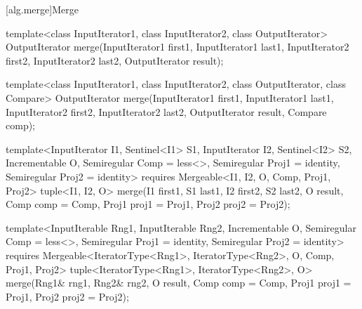 [alg.merge]{Merge}

%
\begin{removedblock}
\begin{itemdecl}
template<class InputIterator1, class InputIterator2,
         class OutputIterator>
  OutputIterator
    merge(InputIterator1 first1, InputIterator1 last1,
          InputIterator2 first2, InputIterator2 last2,
          OutputIterator result);

template<class InputIterator1, class InputIterator2,
         class OutputIterator, class Compare>
  OutputIterator
    merge(InputIterator1 first1, InputIterator1 last1,
          InputIterator2 first2, InputIterator2 last2,
          OutputIterator result, Compare comp);
\end{itemdecl}
\end{removedblock}
\begin{addedblock}
\begin{itemdecl}
template<InputIterator I1, Sentinel<I1> S1, InputIterator I2, Sentinel<I2> S2,
    Incrementable O, Semiregular Comp = less<>, Semiregular Proj1 = identity,
    Semiregular Proj2 = identity>
  requires Mergeable<I1, I2, O, Comp, Proj1, Proj2>
  tuple<I1, I2, O>
    merge(I1 first1, S1 last1, I2 first2, S2 last2, O result,
          Comp comp = Comp{}, Proj1 proj1 = Proj1{}, Proj2 proj2 = Proj2{});

template<InputIterable Rng1, InputIterable Rng2, Incrementable O, Semiregular Comp = less<>,
    Semiregular Proj1 = identity, Semiregular Proj2 = identity>
  requires Mergeable<IteratorType<Rng1>, IteratorType<Rng2>, O, Comp, Proj1, Proj2>
  tuple<IteratorType<Rng1>, IteratorType<Rng2>, O>
    merge(Rng1& rng1, Rng2& rng2, O result,
          Comp comp = Comp{}, Proj1 proj1 = Proj1{}, Proj2 proj2 = Proj2{});
\end{itemdecl}
\end{addedblock}

